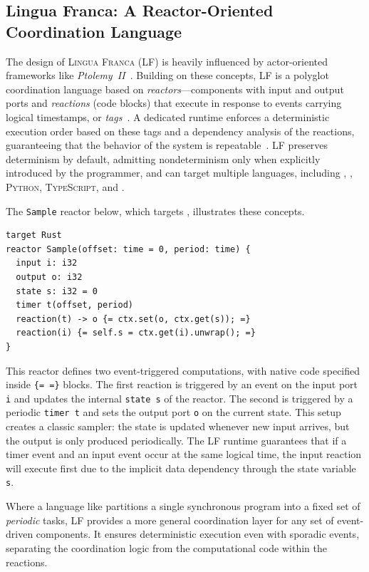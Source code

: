 \subsection{Lingua Franca: A Reactor-Oriented Coordination Language}
\label{sec:sota:distributed:lf}

The design of \textsc{Lingua Franca} (LF) is heavily influenced by actor-oriented frameworks like
\emph{Ptolemy~II}~\cite{DBLP:journals/pieee/EkerJLLLLNSX03}. Building on these concepts, LF is a
polyglot coordination language based on \emph{reactors}---components with input and output ports and
\emph{reactions} (code blocks) that execute in response to events carrying logical timestamps, or
\emph{tags}~\cite{DBLP:journals/tcad/LeeS98}. A dedicated runtime enforces a deterministic execution
order based on these tags and a dependency analysis of the reactions, guaranteeing that the behavior
of the system is repeatable~\cite{DBLP:journals/taco/MenardLBCDDFLSTKCL23}. LF preserves determinism
by default, admitting nondeterminism only when explicitly introduced by the programmer, and can
target multiple languages, including \Ci, \Cpp, \textsc{Python}, \textsc{TypeScript}, and \Rust.

The \texttt{Sample} reactor below, which targets \Rust, illustrates these concepts.

\begin{lstlisting}[basicstyle=\ttfamily\footnotesize\color{BlackText}]
target Rust
reactor Sample(offset: time = 0, period: time) {
  input i: i32
  output o: i32
  state s: i32 = 0
  timer t(offset, period)
  reaction(t) -> o {= ctx.set(o, ctx.get(s)); =}
  reaction(i) {= self.s = ctx.get(i).unwrap(); =}
}
\end{lstlisting}

This reactor defines two event-triggered computations, with native \Rust code specified inside
\texttt{\{= =\}} blocks. The first reaction is triggered by an event on the input port
\texttt{i} and updates the internal \texttt{state s} of the reactor. The second is triggered by a
periodic \texttt{timer t} and sets the output port \texttt{o} on the current state. This setup
creates a classic sampler: the state is updated whenever new input arrives, but the output is only
produced periodically. The LF runtime guarantees that if a timer event and an input event occur at
the same logical time, the input reaction will execute first due to the implicit data dependency
through the state variable \texttt{s}.

Where a language like \Prelude partitions a single synchronous program into a fixed set of
\emph{periodic} tasks, LF provides a more general coordination layer for any set of event-driven
components. It ensures deterministic execution even with sporadic events, separating the
coordination logic from the computational code within the reactions.

